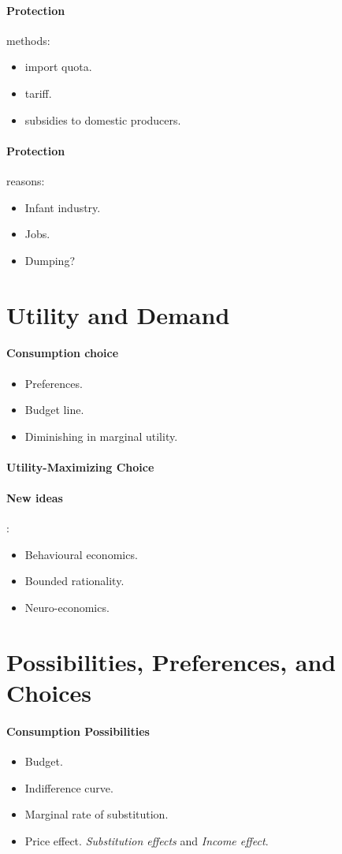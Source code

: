\documentclass{article}
\begin{document}
	\paragraph{Protection} methods:
	\begin{itemize}
		\item import quota.
		\item tariff.
		\item subsidies to domestic producers.
	\end{itemize}
	\paragraph{Protection} reasons:
	\begin{itemize}
		\item Infant industry.
		\item Jobs.
		\item Dumping?
	\end{itemize}
	\section{Utility and Demand}
	\paragraph{Consumption choice}
	\begin{itemize}
		\item Preferences.
		\item Budget line.
		\item Diminishing in marginal utility.
	\end{itemize}
	\paragraph{Utility-Maximizing Choice}
	\paragraph{New ideas}:
	\begin{itemize}
		\item Behavioural economics.
		\item Bounded rationality.
		\item Neuro-economics.
	\end{itemize}
	\section{Possibilities, Preferences, and Choices}
	\paragraph{Consumption Possibilities}
	\begin{itemize}
		\item Budget.
		\item Indifference curve.
		\item Marginal rate of substitution.
		\item Price effect. \emph{Substitution effects} and \emph{Income effect}.
	\end{itemize}
\end{document}

